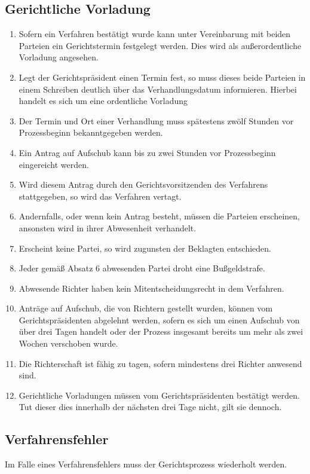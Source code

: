 \documentclass{article}
\begin{document}
\subsection{Gerichtliche Vorladung}
\begin{enumerate}[(1)]
    \item Sofern ein Verfahren bestätigt wurde kann unter Vereinbarung mit beiden Parteien ein Gerichtstermin festgelegt werden. Dies wird als außerordentliche Vorladung angesehen.
    \item Legt der Gerichtspräsident einen Termin fest, so muss dieses beide Parteien in einem Schreiben deutlich über das Verhandlungsdatum informieren. Hierbei handelt es sich um eine ordentliche Vorladung
    \item Der Termin und Ort einer Verhandlung muss spätestens zwölf Stunden vor Prozessbeginn bekanntgegeben werden.
    \item Ein Antrag auf Aufschub kann bis zu zwei Stunden vor Prozessbeginn eingereicht werden.
    \item Wird diesem Antrag durch den Gerichtsvorsitzenden des Verfahrens stattgegeben, so wird das Verfahren vertagt.
    \item Andernfalls, oder wenn kein Antrag besteht, müssen die Parteien erscheinen, ansonsten wird in ihrer Abwesenheit verhandelt.
    \item Erscheint keine Partei, so wird zugunsten der Beklagten entschieden.
    \item Jeder gemäß Absatz 6 abwesenden Partei droht eine Bußgeldstrafe.
    \item Abwesende Richter haben kein Mitentscheidungsrecht in dem Verfahren.
    \item Anträge auf Aufschub, die von Richtern gestellt wurden, können vom Gerichtspräsidenten abgelehnt werden, sofern es sich um einen Aufschub von über drei Tagen handelt oder der Prozess insgesamt bereits um mehr als zwei Wochen verschoben wurde.
    \item Die Richterschaft ist fähig zu tagen, sofern mindestens drei Richter anwesend sind.
    \item Gerichtliche Vorladungen müssen vom Gerichtspräsidenten bestätigt werden. Tut dieser dies innerhalb der nächsten drei Tage nicht, gilt sie dennoch.
\end{enumerate}

\subsection{Verfahrensfehler}
Im Falle eines Verfahrensfehlers muss der Gerichtsprozess wiederholt werden.
\end{document}
